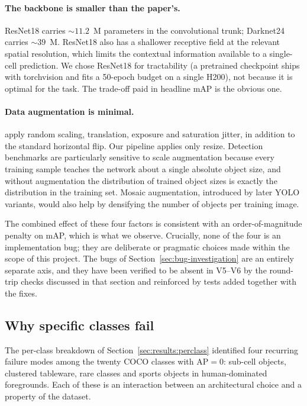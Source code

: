 \paragraph{The backbone is smaller than the paper's.} ResNet18 carries
$\sim\!11.2$~M parameters in the convolutional trunk;
Darknet24~\citep{redmon2016you} carries $\sim\!39$~M. ResNet18 also has a
shallower receptive field at the relevant spatial resolution, which limits
the contextual information available to a single-cell prediction. We chose
ResNet18 for tractability (a pretrained checkpoint ships with torchvision and
fits a 50-epoch budget on a single H200), not because it is optimal for the
task. The trade-off paid in headline mAP is the obvious one.

\paragraph{Data augmentation is minimal.} \citet{redmon2016you} apply random
scaling, translation, exposure and saturation jitter, in addition to the
standard horizontal flip. Our pipeline applies only resize. Detection
benchmarks are particularly sensitive to scale augmentation because every
training sample teaches the network about a single absolute object size, and
without augmentation the distribution of trained object sizes is exactly the
distribution in the training set. Mosaic augmentation, introduced by later
YOLO variants, would also help by densifying the number of objects per
training image.

\medskip

\noindent The combined effect of these four factors is consistent with an
order-of-magnitude penalty on mAP, which is what we observe. Crucially, none
of the four is an implementation bug; they are deliberate or pragmatic
choices made within the scope of this project. The bugs of
Section~\ref{sec:bug-investigation} are an entirely separate axis, and they
have been verified to be absent in V5--V6 by the round-trip checks discussed
in that section and reinforced by tests added together with the fixes.

\subsection{Why specific classes fail}
\label{sec:disc:class-failures}

The per-class breakdown of Section~\ref{sec:results:perclass} identified four
recurring failure modes among the twenty COCO classes with $\mathrm{AP}=0$:
sub-cell objects, clustered tableware, rare classes and sports objects in
human-dominated foregrounds. Each of these is an interaction between an
architectural choice and a property of the dataset.

